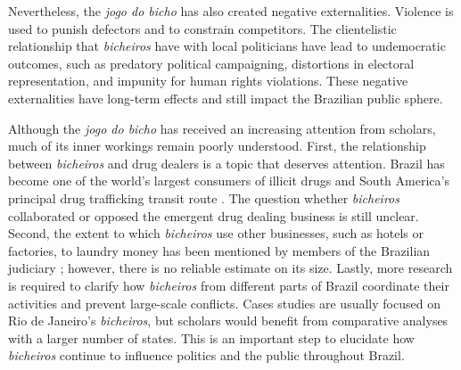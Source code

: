 \documentclass[a4paper,12pt]{article}
\begin{document}
Nevertheless, the \textit{jogo do bicho} has also created negative externalities. Violence is used to punish defectors and to constrain competitors. The clientelistic relationship that \textit{bicheiros} have with local politicians have lead to undemocratic outcomes, such as predatory political campaigning, distortions in electoral representation, and impunity for human rights violations. These negative externalities have long-term effects and still impact the Brazilian public sphere.

Although the \textit{jogo do bicho} has received an increasing attention from scholars, much of its inner workings remain poorly understood. First, the relationship between \textit{bicheiros} and drug dealers is a topic that deserves attention. Brazil has become one of the world's largest consumers of illicit drugs and South America's principal drug trafficking transit route \citep{miraglia2015drugs,misse2011crime}. The question whether \textit{bicheiros} collaborated or opposed the emergent drug dealing business is still unclear. Second, the extent to which \textit{bicheiros} use other businesses, such as hotels or factories, to laundry money has been mentioned by members of the Brazilian judiciary \citep{globo2012bicheiro,globo2015cacaniquel}; however, there is no reliable estimate on its size. Lastly, more research is required to clarify how \textit{bicheiros} from different parts of Brazil coordinate their activities and prevent large-scale conflicts. Cases studies are usually focused on Rio de Janeiro's \textit{bicheiros}, but scholars would benefit from comparative analyses with a larger number of states. This is an important step to elucidate how \textit{bicheiros} continue to influence politics and the public throughout Brazil.

\newpage


\end{document}
